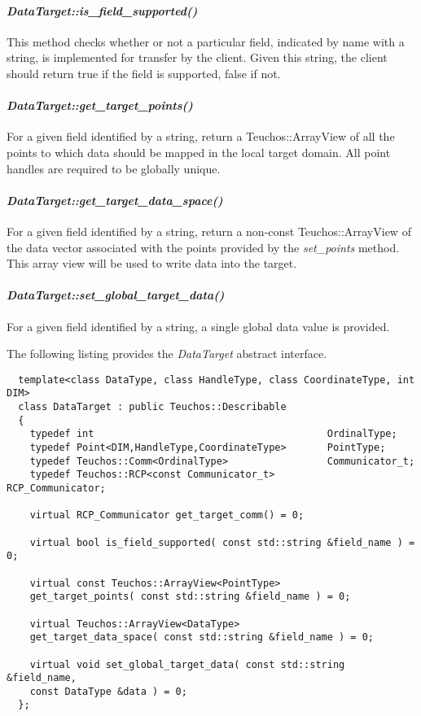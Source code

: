 \documentclass[letterpaper]{article}
\begin{document}
\paragraph{\sl DataTarget::is\_field\_supported()}
This method checks whether or not a particular field, indicated by
name with a string, is implemented for transfer by the client. Given
this string, the client should return true if the field is supported,
false if not.

\paragraph{\sl DataTarget::get\_target\_points()}
For a given field identified by a string, return a Teuchos::ArrayView
of all the points to which data should be mapped in the local target
domain. All point handles are required to be globally unique.

\paragraph{\sl DataTarget::get\_target\_data\_space()}
For a given field identified by a string, return a non-const
Teuchos::ArrayView of the data vector associated with the points
provided by the {\sl set\_points} method. This array view will be used
to write data into the target.

\paragraph{\sl DataTarget::set\_global\_target\_data()}
For a given field identified by a string, a single global data value
is provided.

The following listing provides the {\sl DataTarget} abstract
interface. 

\begin{lstlisting}
  template<class DataType, class HandleType, class CoordinateType, int DIM>
  class DataTarget : public Teuchos::Describable
  {
    typedef int                                        OrdinalType;
    typedef Point<DIM,HandleType,CoordinateType>       PointType;
    typedef Teuchos::Comm<OrdinalType>                 Communicator_t;
    typedef Teuchos::RCP<const Communicator_t>         RCP_Communicator;

    virtual RCP_Communicator get_target_comm() = 0;

    virtual bool is_field_supported( const std::string &field_name ) = 0;

    virtual const Teuchos::ArrayView<PointType> 
    get_target_points( const std::string &field_name ) = 0;

    virtual Teuchos::ArrayView<DataType> 
    get_target_data_space( const std::string &field_name ) = 0;

    virtual void set_global_target_data( const std::string &field_name,
    const DataType &data ) = 0;
  };
\end{lstlisting}
\end{document}
